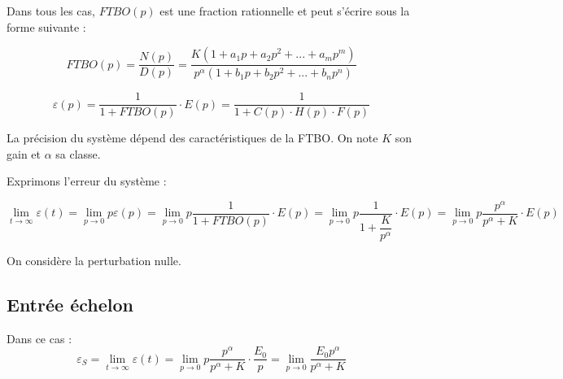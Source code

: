 \documentclass[10pt,oneside]{article}
\begin{document}
Dans tous les cas, $FTBO(p)$ est une fraction rationnelle et peut s'écrire sous la forme suivante : 

$$
FTBO(p)=\dfrac{N(p)}{D(p)}=\dfrac{K\left(1+a_1p +a_2p^2 + ... + a_m p^m \right)}{p^\alpha \left(1+b_1p +b_2p^2 + ... + b_n p^n \right)}
$$


$$
\varepsilon(p)
=\dfrac{1}{1+FTBO(p)} \cdot E(p)
=\dfrac{1}{1+C(p) \cdot H(p) \cdot F(p)} 
$$

\begin{rem}
La précision du système dépend des caractéristiques de la FTBO. On note $K$ son gain et $\alpha$ sa classe.
\end{rem}


Exprimons l'erreur du système :

$$
\lim\limits_{t\to \infty} \varepsilon(t) = \lim\limits_{p\to 0} p \varepsilon(p)
= \lim\limits_{p\to 0} p \dfrac{1}{1+FTBO(p)} \cdot E(p)
= \lim\limits_{p\to 0} p \dfrac{1}{1+\dfrac{K}{p^\alpha}} \cdot E(p)
= \lim\limits_{p\to 0} p \dfrac{p^\alpha}{p^\alpha+K} \cdot E(p)
$$


\begin{exemple}
On considère la perturbation nulle.
\end{exemple}

\subsection{Entrée échelon}
Dans ce cas : 
$$
\varepsilon_S =
\lim\limits_{t\to \infty} \varepsilon(t) 
= \lim\limits_{p\to 0} p \dfrac{p^\alpha}{p^\alpha+K} \cdot \dfrac{E_0}{p}
= \lim\limits_{p\to 0}  \dfrac{E_0 p^\alpha}{p^\alpha+K} 
$$
\end{document}
